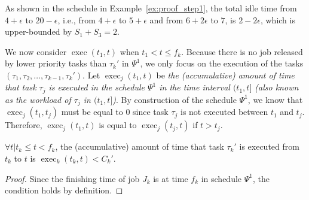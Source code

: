 \begin{example}
As shown in the schedule in Example~\ref{ex:proof_step1}, the total idle time from $4+\epsilon$ to
$20-\epsilon$, i.e., from $4+\epsilon$ to $5+\epsilon$ and from
$6+2\epsilon$ to $7$, is $2-2\epsilon$, which is upper-bounded by $S_1+S_3 = 2$. 
\end{example}

%


We now consider $\operatorname{exec}(t_1, t)$ when $t_1 < t \leq f_k$.
Because there is no job released by lower priority tasks than
$\tau_k'$ in $\Psi^1$, we only focus on the execution of the
tasks $(\tau_1, \tau_2, \ldots, \tau_{k-1}, \tau_k')$. Let
$\operatorname{exec}_j(t_1, t)$ be \emph{the
 (accumulative) amount of time that task $\tau_j$ is executed in the schedule
  $\Psi^1$ in the time interval $(t_1, t]$ (also known as the workload of $\tau_j$ in $(t_1, t]$)}. By construction of the
schedule $\Psi^1$, we know that $\operatorname{exec}_j(t_1, t_j)$ must
be equal to $0$ since task $\tau_j$ is not executed between $t_1$ and $t_j$. %
Therefore, $\operatorname{exec}_j(t_1, t)$ is equal to
$\operatorname{exec}_j(t_j, t)$ if $t > t_j$.

\begin{Lemma}
  \label{lemma:exec-tau-k}
  $\forall t | t_k \leq t < f_k$, the (accumulative) amount of time that
  task $\tau_k'$ is executed from $t_k$ to $t$ is $\operatorname{exec}_k(t_k, t) < C_k'$.
\end{Lemma}
\begin{proof}
  Since the finishing time of job $J_k$ is at time $f_k$ in schedule $\Psi^1$, the
  condition holds by definition.
\end{proof}

